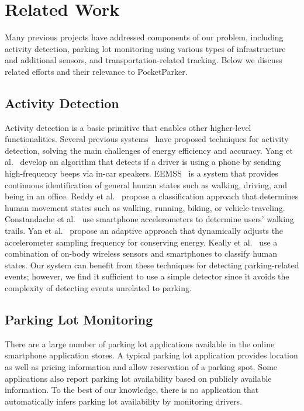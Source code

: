 \section{Related Work}
\label{sec-related}

Many previous projects have addressed components of our problem, including
activity detection, parking lot monitoring using various types of
infrastructure and additional sensors, and transportation-related tracking.
Below we discuss related efforts and their relevance to PocketParker.

\subsection{Activity Detection}

Activity detection is a basic primitive that enables other higher-level
functionalities. Several previous systems~\cite{Constandache:2010:DYS,
Keally:2011:PTP, Reddy:2010:UMP, Yang:2011:DDP, Wang:2009:FEE} have proposed
techniques for activity detection, solving the main challenges of energy
efficiency and accuracy. Yang et al.~\cite{Yang:2011:DDP} develop an algorithm
that detects if a driver is using a phone by sending high-frequency beeps via
in-car speakers. EEMSS~\cite{Wang:2009:FEE} is a system that provides continuous
identification of general human states such as walking, driving, and being in an
office. Reddy et al.~\cite{Reddy:2010:UMP} propose a classification approach
that determines human movement states such as walking, running, biking, or
vehicle-traveling. Constandache et al.~\cite{Constandache:2010:DYS} use
smartphone accelerometers to determine users' walking trails. Yan et
al.~\cite{6246136} propose an adaptive approach that dynamically adjusts the
accelerometer sampling frequency for conserving energy. Keally et
al.~\cite{Keally:2011:PTP} use a combination of on-body wireless sensors and
smartphones to classify human states. Our system can benefit from these
techniques for detecting parking-related events; however, we find it sufficient
to use a simple detector since it avoids the complexity of detecting events
unrelated to parking.

\subsection{Parking Lot Monitoring}

There are a large number of parking lot applications available in the online
smartphone application stores. A typical parking lot application provides
location as well as pricing information and allow reservation of a parking spot.
Some applications also report parking lot availability based on publicly
available information. To the best of our knowledge, there is no application
that automatically infers parking lot availability by monitoring drivers.

